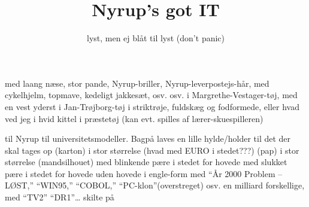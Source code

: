 \documentclass[11pt,danish]{article}
\title{Nyrup's got IT}
\author{lyst, men ej blåt til lyst (don't \textsf{panic})}
\begin{document}
\maketitle

\begin{roles}
   med laang næse, stor pande, Nyrup-briller,
  Nyrup-leverpostejs-hår, med cykelhjelm, topmave, kedeligt jakkesæt,
  osv. osv.
   i Margrethe-Vestager-tøj, med en vest
  yderst
   i Jan-Trøjborg-tøj
   i striktrøje, fuldskæg og fodformede, eller
  hvad ved jeg
   i hvid kittel
   i præstetøj (kan evt. spilles af lærer-skuespilleren)
\end{roles}
\begin{props}
   til Nyrup
   til universitetsmodeller. Bagpå laves en lille
  hylde/holder til det der skal tages op
   (karton) i stor størrelse (hvad med EURO i stedet???)
   (pap) i stor størrelse
   (mandsilhouet) med blinkende pære i stedet for hovede
   med slukket pære i stedet for hovede
   uden hovede
   i engle-form
   med ``År 2000 Problem -- LØST,'' ``WIN95,''
  ``COBOL,'' ``PC-klon''(overstreget) osv.
   en milliard forskellige, med ``TV2'' ``DR1''\ldots 
  skilte på
\end{props}
\end{document}
